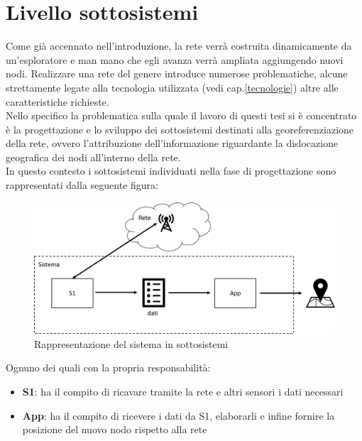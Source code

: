 \section{Livello sottosistemi}
\label{livello_sottosistemi}
Come già accennato nell'introduzione, la rete verrà costruita dinamicamente da un'esploratore e man mano che egli avanza verrà ampliata aggiungendo nuovi nodi.
Realizzare una rete del genere introduce numerose problematiche, alcune strettamente legate alla tecnologia utilizzata (vedi cap.\ref{tecnologie}) altre alle caratteristiche richieste.\\
Nello specifico la problematica sulla quale il lavoro di questi tesi si è concentrato è la progettazione e lo sviluppo dei sottosistemi destinati alla georeferenziazione della rete, ovvero l'attribuzione dell'informazione riguardante la dislocazione geografica dei nodi all'interno della rete.\\
In questo contesto i sottosistemi individuati nella fase di progettazione sono rappresentati dalla seguente figura: 
\begin{figure}[H]
	\centering
	\includegraphics[scale=0.3]{DescrizioneDelSistema/sistema_liv1.png}
	\caption{Rappresentazione del sistema in sottosistemi }
	\label{fig:sistema_liv1}
\end{figure}

Ognuno dei quali con la propria responsabilità:
\begin{itemize}
	\item \textbf{S1}: ha il compito di ricavare tramite la rete e altri sensori i dati necessari
	\item \textbf{App}: ha il compito di ricevere i dati da S1, elaborarli e infine fornire la posizione del nuovo nodo rispetto alla rete
\end{itemize}

